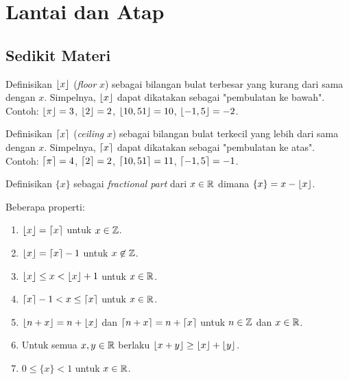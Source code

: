 \documentclass[11pt]{scrartcl}
\begin{document}
\section{Lantai dan Atap}
\subsection{Sedikit Materi}
Definisikan $\left\lfloor x \right\rfloor$ (\textit{floor} $x$) sebagai bilangan bulat terbesar yang kurang dari sama dengan $x$. Simpelnya, $\left\lfloor x \right\rfloor$ dapat dikatakan sebagai "pembulatan ke bawah". Contoh: $\left\lfloor \pi \right\rfloor=3$, $\left\lfloor 2 \right\rfloor=2$, $\left\lfloor 10,51 \right\rfloor=10$, $\left\lfloor -1,5 \right\rfloor=-2$.

Definisikan $\left\lceil x \right\rceil$ (\textit{ceiling} $x$) sebagai bilangan bulat terkecil yang lebih dari sama dengan $x$. Simpelnya, $\left\lceil x \right\rceil$ dapat dikatakan sebagai "pembulatan ke atas". Contoh: $\left\lceil \pi \right\rceil=4$, $\left\lceil 2 \right\rceil=2$, $\left\lceil 10,51 \right\rceil=11$, $\left\lceil -1,5 \right\rceil=-1$.

Definisikan $\{x\}$ sebagai \textit{fractional part} dari $x \in \mathbb R$ dimana $\{x\} = x - \left\lfloor x \right\rfloor$.

Beberapa properti:
\begin{enumerate}
    \item $\left\lfloor x \right\rfloor=\left\lceil x \right\rceil$ untuk $x \in \mathbb Z$.
    \item $\left\lfloor x \right\rfloor=\left\lceil x \right\rceil-1$ untuk $x \not \in \mathbb Z$.
    \item $\left\lfloor x \right\rfloor \le  x < \left\lfloor x \right\rfloor+1$ untuk $x \in \mathbb R$.
    \item $\left\lceil x \right\rceil-1 < x \le \left\lceil x \right\rceil$ untuk $x \in \mathbb R$.
    \item $\left\lfloor n+x \right\rfloor=n+\left\lfloor x \right\rfloor$ dan $\left\lceil n+x \right\rceil=n+\left\lceil x \right\rceil$ untuk $n\in \mathbb Z$ dan $x \in \mathbb R$.
    \item Untuk semua $x,y \in \mathbb R$ berlaku $\left\lfloor x+y \right\rfloor \ge \left\lfloor x \right\rfloor+\left\lfloor y \right\rfloor$.
    
    \item $0 \le \{x\} < 1$ untuk $x \in \mathbb R$.
\end{enumerate}
\end{document}

